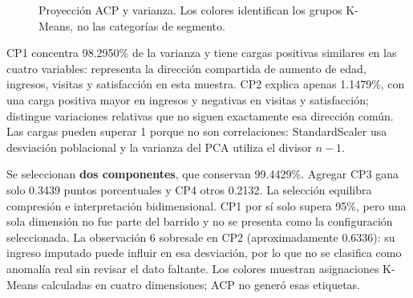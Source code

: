 \documentclass[11pt]{article}
\begin{document}
\begin{figure}[htbp]\centering
{}\hfill
{}
\caption{Proyección ACP y varianza. Los colores identifican los grupos K-Means, no las categorías de segmento.}\label{fig:acp}
\end{figure}

CP1 concentra 98.2950\% de la varianza y tiene cargas positivas similares
en las cuatro variables: representa la dirección compartida de aumento de
edad, ingresos, visitas y satisfacción en esta muestra. CP2 explica apenas
1.1479\%, con una carga positiva mayor en ingresos y negativas en visitas
y satisfacción; distingue variaciones relativas que no siguen exactamente
esa dirección común.
Las cargas pueden superar 1 porque no son correlaciones: StandardScaler
usa desviación poblacional y la varianza del PCA utiliza el divisor $n-1$.

Se seleccionan \textbf{dos componentes}, que conservan 99.4429\%.
Agregar CP3 gana solo 0.3439 puntos porcentuales y CP4 otros 0.2132.
La selección equilibra compresión e interpretación bidimensional. CP1 por
sí solo supera 95\%, pero una sola dimensión no fue parte del barrido y no
se presenta como la configuración seleccionada.
La observación 6 sobresale en CP2 (aproximadamente 0.6336): su ingreso
imputado puede influir en esa desviación, por lo que no se clasifica como
anomalía real sin revisar el dato faltante.
Los colores muestran asignaciones K-Means calculadas en cuatro dimensiones;
ACP no generó esas etiquetas.
\FloatBarrier
\clearpage
\end{document}
